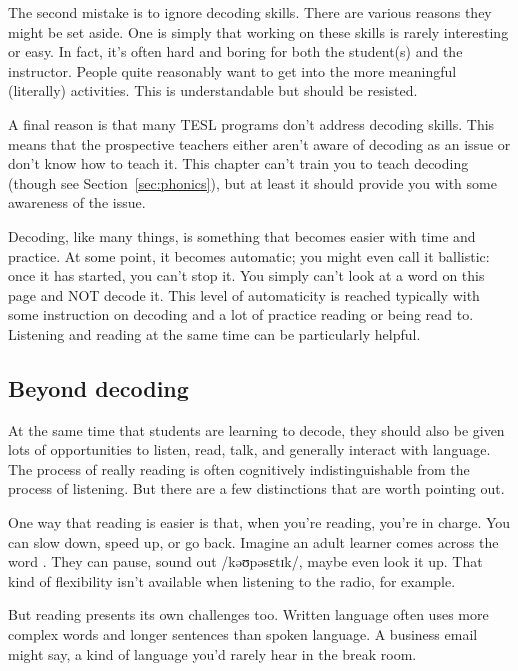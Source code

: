 The second mistake is to ignore decoding skills. There are various reasons they might be set aside. One is simply that working on these skills is rarely interesting or easy. In fact, it's often hard and boring for both the student(s) and the instructor. People quite reasonably want to get into the more meaningful (literally) activities. This is understandable but should be resisted.

A final reason is that many TESL programs don't address decoding skills. This means that the prospective teachers either aren't aware of decoding as an issue or don't know how to teach it. This chapter can't train you to teach decoding (though see Section~\ref{sec:phonics}), but at least it should provide you with some awareness of the issue.

Decoding, like many things, is something that becomes easier with time and practice. At some point, it becomes automatic; you might even call it ballistic: once it has started, you can't stop it. You simply can't look at a word on this page and NOT decode it. This level of automaticity is reached typically with some instruction on decoding and a lot of practice reading or being read to. Listening and reading at the same time can be particularly helpful.

\subsection{Beyond decoding}

At the same time that students are learning to decode, they should also be given lots of opportunities to listen, read, talk, and generally interact with language. The process of really reading is often cognitively indistinguishable from the process of listening. But there are a few distinctions that are worth pointing out.

One way that reading is easier is that, when you're reading, you're in charge. You can slow down, speed up, or go back. Imagine an adult learner comes across the word . They can pause, sound out /kəʊpəsɛtɪk/, maybe even look it up. That kind of flexibility isn't available when listening to the radio, for example.

But reading presents its own challenges too. Written language often uses more complex words and longer sentences than spoken language. A business email might say,  a kind of language you'd rarely hear in the break room.

